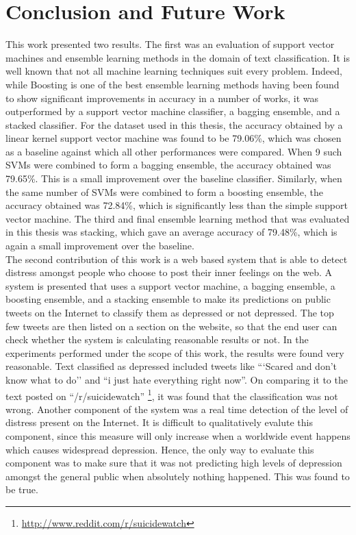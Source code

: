 \chapter{Conclusion and Future Work}
\label{chapter:Conclusion}

This work presented two results. The first was an evaluation of support vector machines and ensemble learning methods in the domain of text classification. It is well known that not all machine learning techniques suit every problem. Indeed, while Boosting is one of the best ensemble learning methods having been found to show significant improvements in accuracy in a number of works, it was outperformed by a support vector machine classifier, a bagging ensemble, and a stacked classifier. For the dataset used in this thesis, the accuracy obtained by a linear kernel support vector machine was found to be 79.06\%, which was chosen as a baseline against which all other performances were compared. When 9 such SVMs were combined to form a bagging ensemble, the accuracy obtained was 79.65\%. This is a small improvement over the baseline classifier. Similarly, when the same number of SVMs were combined to form a boosting ensemble, the accuracy obtained was 72.84\%, which is significantly less than the simple support vector machine. The third and final ensemble learning method that was evaluated in this thesis was stacking, which gave an average accuracy of 79.48\%, which is again a small improvement over the baseline.\\

The second contribution of this work is a web based system that is able to detect distress amongst people who choose to post their inner feelings on the web. A system is presented that uses a support vector machine, a bagging ensemble, a boosting ensemble, and a stacking ensemble to make its predictions on public tweets on the Internet to classify them as depressed or not depressed. The top few tweets are then listed on a section on the website, so that the end user can check whether the system is calculating reasonable results or not. In the experiments performed under the scope of this work, the results were found very reasonable. Text classified as depressed included tweets like ```Scared and don't know what to do'' and ``i just hate everything right now''. On comparing it to the text posted on ``/r/suicidewatch'' \footnote{\url{http://www.reddit.com/r/suicidewatch}}, it was found that the classification was not wrong. Another component of the system was a real time detection of the level of distress present on the Internet. It is difficult to qualitatively evalute this component, since this measure will only increase when a worldwide event happens which causes widespread depression. Hence, the only way to evaluate this component was to make sure that it was not predicting high levels of depression amongst the general public when absolutely nothing happened. This was found to be true.\\


